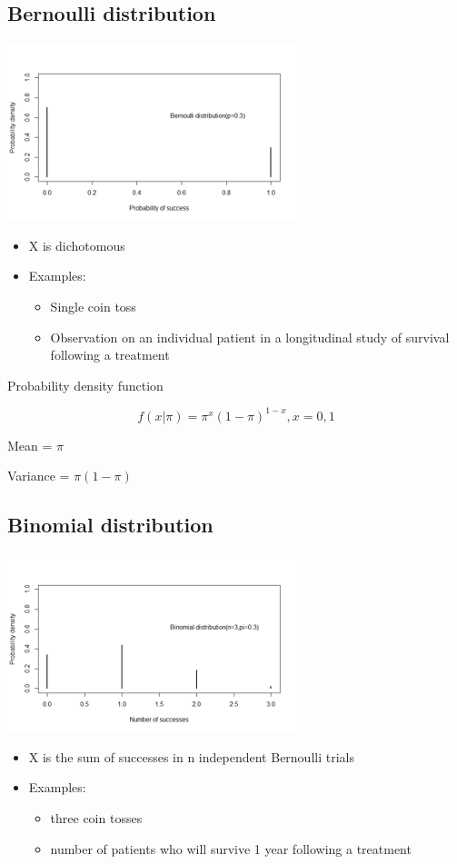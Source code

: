 \documentclass[
]{book}
\providecommand{\tightlist}{%
  \setlength{\itemsep}{0pt}\setlength{\parskip}{0pt}}
\begin{document}
\hypertarget{bernoulli-distribution}{%
\subsection{Bernoulli distribution}\label{bernoulli-distribution}}

\includegraphics[width=0.5\linewidth]{./2_60}

\begin{itemize}
\tightlist
\item
  X is dichotomous
\item
  Examples:

  \begin{itemize}
  \tightlist
  \item
    Single coin toss
  \item
    Observation on an individual patient in a longitudinal study of survival following a treatment
  \end{itemize}
\end{itemize}

Probability density function

\[f(x|\pi)=\pi^x(1-\pi)^{1-x},x=0,1\]

Mean = \(\pi\)

Variance = \(\pi(1-\pi)\)

\hypertarget{binomial-distribution-1}{%
\subsection{Binomial distribution}\label{binomial-distribution-1}}

\includegraphics[width=0.5\linewidth]{./2_61}

\begin{itemize}
\tightlist
\item
  X is the sum of successes in n independent Bernoulli trials
\item
  Examples:

  \begin{itemize}
  \tightlist
  \item
    three coin tosses
  \item
    number of patients who will survive 1 year following a treatment
  \end{itemize}
\end{itemize}
\end{document}

